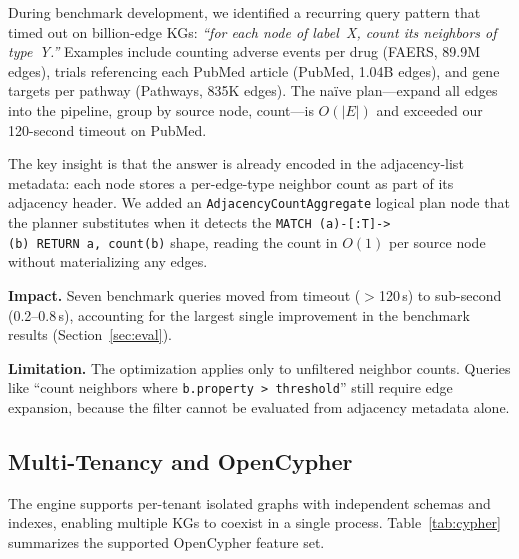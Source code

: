 \documentclass[runningheads]{llncs}
\begin{document}
During benchmark development, we identified a recurring query
pattern that timed out on billion-edge KGs: \emph{``for each node of
label~X, count its neighbors of type~Y.''}  Examples include counting
adverse events per drug (FAERS, 89.9M edges), trials referencing each
PubMed article (PubMed, 1.04B edges), and gene targets per pathway
(Pathways, 835K edges).  The na\"ive plan---expand all edges into
the pipeline, group by source node, count---is $O(|E|)$ and
exceeded our 120-second timeout on PubMed.

The key insight is that the answer is already encoded in the
adjacency-list metadata: each node stores a per-edge-type neighbor
count as part of its adjacency header.  We added an
\texttt{AdjacencyCountAggregate} logical plan node that the planner
substitutes when it detects the
\texttt{MATCH~(a)-[:T]->(b)~RETURN~a,~count(b)} shape, reading the
count in $O(1)$ per source node without materializing any edges.

\smallskip\noindent\textbf{Impact.}  Seven benchmark queries moved
from timeout ($>$120\,s) to sub-second (0.2--0.8\,s), accounting
for the largest single improvement in the benchmark results
(Section~\ref{sec:eval}).

\smallskip\noindent\textbf{Limitation.}  The optimization applies
only to unfiltered neighbor counts.  Queries like ``count neighbors
where \texttt{b.property > threshold}'' still require edge expansion,
because the filter cannot be evaluated from adjacency metadata alone.

\subsection{Multi-Tenancy and OpenCypher}\label{sec:cypher}

The engine supports per-tenant isolated graphs with independent
schemas and indexes, enabling multiple KGs to coexist in a single
process.  Table~\ref{tab:cypher} summarizes the supported OpenCypher
feature set.
\end{document}
